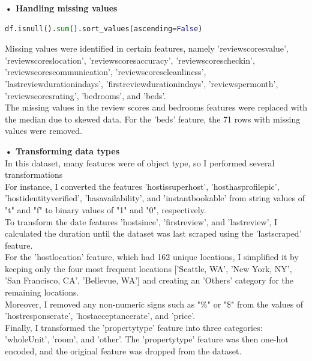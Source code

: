 \documentclass{article}
\begin{document}
\textbf{• Handling missing values}\\
\begin{lstlisting}[language=Python, caption=Python code snippet for missing values]
df.isnull().sum().sort_values(ascending=False)
\end{lstlisting} 
Missing values were identified in certain features, namely 'review\textunderscore scores\textunderscore value', 'review\textunderscore scores\textunderscore location', 'review\textunderscore scores\textunderscore accuracy', 'review\textunderscore scores\textunderscore checkin', 'review\textunderscore scores\textunderscore communication', 'review\textunderscore scores\textunderscore cleanliness', 'last\textunderscore review\textunderscore duration\textunderscore in\textunderscore days', 'first\textunderscore review\textunderscore duration\textunderscore in\textunderscore days', 'reviews\textunderscore per\textunderscore month', 'review\textunderscore scores\textunderscore rating', 'bedrooms', and 'beds'.\\
The missing values in the review scores and bedrooms features were replaced with the median due to skewed data. For the 'beds' feature, the 71 rows with missing values were removed.\vspace{.5cm}

\textbf{• Transforming data types}\\
In this dataset, many features were of object type, so I performed several transformations\\
For instance, I converted the features 'host\textunderscore is\textunderscore superhost', 'host\textunderscore has\textunderscore profile\textunderscore pic', 'host\textunderscore identity\textunderscore verified', 'has\textunderscore availability', and 'instant\textunderscore bookable' from string values of "t" and "f" to binary values of "1" and "0", respectively.\\
To transform the date features 'host\textunderscore since', 'first\textunderscore review', and 'last\textunderscore review', I calculated the duration until the dataset was last scraped using the 'last\textunderscore scraped' feature.\\
For the 'host\textunderscore location' feature, which had 162 unique locations, I simplified it by keeping only the four most frequent locations ['Seattle, WA', 'New York, NY', 'San Francisco, CA', 'Bellevue, WA'] and creating an 'Others' category for the remaining locations.\\
Moreover, I removed any non-numeric signs such as "\%" or "\$" from the values of 'host\textunderscore response\textunderscore rate', 'host\textunderscore acceptance\textunderscore rate', and 'price'.\\
Finally, I transformed the 'property\textunderscore type' feature into three categories: 'wholeUnit', 'room', and 'other'. The 'property\textunderscore type' feature was then one-hot encoded, and the original feature was dropped from the dataset.\vspace{.5cm}
\end{document}
